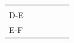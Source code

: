 {{\begin{center}
\begin{tabular}[t]{|l|l|l|l|l|l|}
         &
         &
         &
         &
     \tabularnewline\cline{1-1}\cline{2-2}\cline{3-3}\cline{4-4}\cline{5-5}\cline{6-6}
        D-E &
         &
         &
         &
         &
     \tabularnewline\cline{1-1}\cline{2-2}\cline{3-3}\cline{4-4}\cline{5-5}\cline{6-6}
        E-F &

\end{tabular}
\end{center}}}
